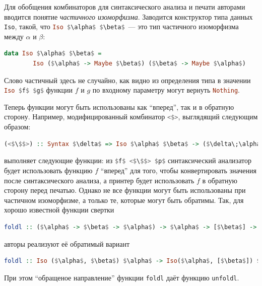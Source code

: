 Для обобщения комбинаторов для синтаксического анализа и печати авторами вводится понятие \emph{частичного изоморфизма}. 
Заводится конструктор типа данных \lstinline{Iso}, такой, что \lstinline[language=Haskell,mathescape]{Iso $\alpha$ $\beta$}~---
это тип частичного изоморфизма между $\alpha$ и $\beta$:

\begin{lstlisting}[mathescape,language=Haskell]
   data Iso $\alpha$ $\beta$ =
        Iso ($\alpha$ -> Maybe $\beta$) ($\beta$ -> Maybe $\alpha$)
\end{lstlisting}

Слово частичный здесь не случайно, как видно из определения типа в значении \lstinline[language=Haskell,mathescape]{Iso $f$ $g$}
функции $f$ и $g$ по входному параметру могут вернуть \lstinline[language=Haskell]{Nothing}. 

Теперь функции могут быть использованы как ``вперед'', так и в обратную сторону. Например, модифицированный комбинатор 
\lstinline[language=Haskell]{<$>}, выглядящий следующим образом:

\begin{lstlisting}[language=Haskell,mathescape]
   (<$\$$>) :: Syntax $\delta$ => Iso $\alpha$ $\beta$ -> ($\delta\;\alpha$ -> $\delta\;\beta$)
\end{lstlisting}

\noindent выполняет следующие функции: из \lstinline[language=Haskell,mathescape]{$f$ <$\$$> $p$} синтаксический анализатор будет 
использовать функцию $f$ ``вперед'' для того, чтобы конвертировать значения после синтаксического анализа, а принтер будет использовать 
$f$ в обратную сторону перед печатью. Однако не все функции могут быть использованы при частичном изоморфизме, а только те, 
которые могут быть обратимы. Так, для хорошо известной функции свертки

\begin{lstlisting}[mathescape,language=Haskell]
   foldl :: ($\alpha$ -> $\beta$ -> $\alpha$) -> $\alpha$ -> [$\beta$] -> $\alpha$
\end{lstlisting}

авторы реализуют её обратимый вариант

\begin{lstlisting}[mathescape,language=Haskell]
   foldl :: Iso ($\alpha$, $\beta$) $\alpha$ -> Iso($\alpha$, [$\beta$]) $\alpha$
\end{lstlisting}

При этом ``обращеное направление'' функции \lstinline{foldl} даёт функцию \lstinline{unfoldl}.

